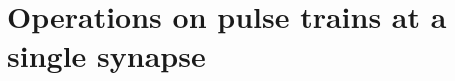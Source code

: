 \documentclass[twocolumn]{article}
\begin{document}
\begin{figure} 
\end{figure}

\section{\label{sec:short_term}Operations on pulse trains at a single synapse}
\end{document}
